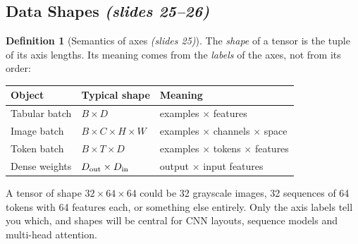 \documentclass[11pt,a4paper]{article}
\newcommand{\slides}[1]{\texorpdfstring{\emph{(slides #1)}}{(slides #1)}}
\theoremstyle{definition}
\newtheorem{definition}{Definition}[section]
\theoremstyle{plain}
\begin{document}
\subsection{Data Shapes \slides{25--26}}

\begin{definition}[Semantics of axes \slides{25}]
The \emph{shape} of a tensor is the tuple of its axis lengths. Its meaning comes from the \emph{labels} of the axes, not from its order:
\begin{center}
\small
\begin{tabular}{@{}lll@{}}
\toprule
Object & Typical shape & Meaning\\\midrule
Tabular batch & $B\times D$ & examples $\times$ features\\
Image batch & $B\times C\times H\times W$ & examples $\times$ channels $\times$ space\\
Token batch & $B\times T\times D$ & examples $\times$ tokens $\times$ features\\
Dense weights & $D_{\rm out}\times D_{\rm in}$ & output $\times$ input features\\\bottomrule
\end{tabular}
\end{center}
\end{definition}

\begin{intuition}
A tensor of shape $32\times64\times64$ could be 32 grayscale images, 32 sequences of 64 tokens with 64 features each, or something else entirely. Only the axis labels tell you which, and shapes will be central for CNN layouts, sequence models and multi-head attention.
\end{intuition}
\end{document}
